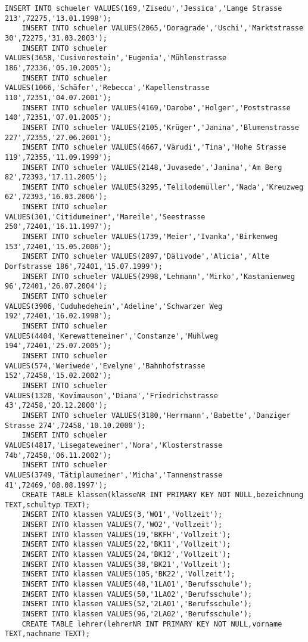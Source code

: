 \begin{lstlisting}[breaklines=True, numbers=none, basicstyle=\tiny, keepspaces=false]
	INSERT INTO schueler VALUES(169,'Zisedu','Jessica','Lange Strasse 213',72275,'13.01.1998');
	INSERT INTO schueler VALUES(2065,'Doragrade','Uschi','Marktstrasse 30',72275,'31.03.2003');
	INSERT INTO schueler VALUES(3658,'Cusivorestein','Eugenia','Mühlenstrasse 186',72336,'05.10.2005');
	INSERT INTO schueler VALUES(1066,'Schäfer','Rebecca','Kapellenstrasse 110',72351,'04.07.2001');
	INSERT INTO schueler VALUES(4169,'Darobe','Holger','Poststrasse 140',72351,'07.01.2005');
	INSERT INTO schueler VALUES(2105,'Krüger','Janina','Blumenstrasse 227',72355,'27.06.2001');
	INSERT INTO schueler VALUES(4667,'Värudi','Tina','Hohe Strasse 119',72355,'11.09.1999');
	INSERT INTO schueler VALUES(2148,'Juvasede','Janina','Am Berg 82',72393,'17.11.2005');
	INSERT INTO schueler VALUES(3295,'Telilodemüller','Nada','Kreuzweg 62',72393,'16.03.2006');
	INSERT INTO schueler VALUES(301,'Citidumeiner','Mareile','Seestrasse 250',72401,'16.11.1997');
	INSERT INTO schueler VALUES(1739,'Meier','Ivanka','Birkenweg 153',72401,'15.05.2006');
	INSERT INTO schueler VALUES(2897,'Dälivode','Alicia','Alte Dorfstrasse 186',72401,'15.07.1999');
	INSERT INTO schueler VALUES(2998,'Lehmann','Mirko','Kastanienweg 96',72401,'26.07.2004');
	INSERT INTO schueler VALUES(3906,'Cuduhedehein','Adeline','Schwarzer Weg 192',72401,'16.02.1998');
	INSERT INTO schueler VALUES(4404,'Kerewattemeiner','Constanze','Mühlweg 194',72401,'25.07.2005');
	INSERT INTO schueler VALUES(574,'Weriwede','Evelyne','Bahnhofstrasse 152',72458,'15.02.2002');
	INSERT INTO schueler VALUES(1320,'Kovimauson','Diana','Friedrichstrasse 43',72458,'20.12.2000');
	INSERT INTO schueler VALUES(3180,'Herrmann','Babette','Danziger Strasse 274',72458,'10.10.2000');
	INSERT INTO schueler VALUES(4817,'Lisegateweiner','Nora','Klosterstrasse 74b',72458,'06.11.2002');
	INSERT INTO schueler VALUES(3749,'Tätiplaumeiner','Micha','Tannenstrasse 41',72469,'08.08.1997');
	CREATE TABLE klassen(klasseNR INT PRIMARY KEY NOT NULL,bezeichnung TEXT,schultyp TEXT);
	INSERT INTO klassen VALUES(3,'WO1','Vollzeit');
	INSERT INTO klassen VALUES(7,'WO2','Vollzeit');
	INSERT INTO klassen VALUES(19,'BKFH','Vollzeit');
	INSERT INTO klassen VALUES(22,'BK11','Vollzeit');
	INSERT INTO klassen VALUES(24,'BK12','Vollzeit');
	INSERT INTO klassen VALUES(38,'BK21','Vollzeit');
	INSERT INTO klassen VALUES(105,'BK22','Vollzeit');
	INSERT INTO klassen VALUES(48,'1LA01','Berufsschule');
	INSERT INTO klassen VALUES(50,'1LA02','Berufsschule');
	INSERT INTO klassen VALUES(52,'2LA01','Berufsschule');
	INSERT INTO klassen VALUES(96,'2LA02','Berufsschule');
	CREATE TABLE lehrer(lehrerNR INT PRIMARY KEY NOT NULL,vorname TEXT,nachname TEXT);

\end{lstlisting}
